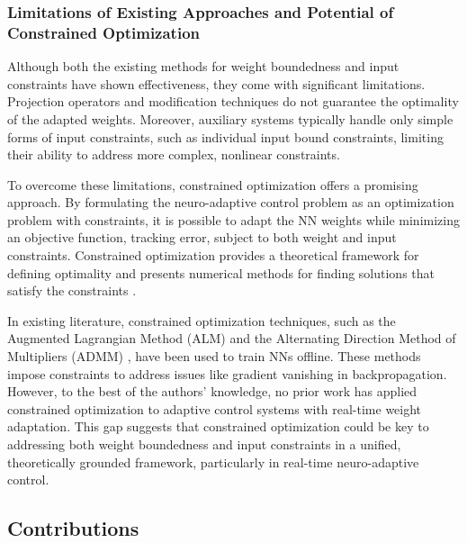 \documentclass[journal]{IEEEtran}
\begin{document}
\hfill

\subsubsection{Limitations of Existing Approaches and Potential of Constrained Optimization}

Although both the existing methods for weight boundedness and input constraints have shown effectiveness, they come with significant limitations. 
Projection operators and modification techniques do not guarantee the optimality of the adapted weights. 
Moreover, auxiliary systems typically handle only simple forms of input constraints, such as individual input bound constraints, limiting their ability to address more complex, nonlinear constraints.

To overcome these limitations, constrained optimization offers a promising approach. 
By formulating the neuro-adaptive control problem as an optimization problem with constraints, it is possible to adapt the NN weights while minimizing an objective function, \eg tracking error, subject to both weight and input constraints. 
Constrained optimization provides a theoretical framework for defining optimality and presents numerical methods for finding solutions that satisfy the constraints \cite{Nocedal:2006aa}.

In existing literature, constrained optimization techniques, such as the Augmented Lagrangian Method (ALM) \cite{Evens:2021aa} and the Alternating Direction Method of Multipliers (ADMM) \cite{Wang:2019aa,Taylor:2016aa}, have been used to train NNs offline. 
These methods impose constraints to address issues like gradient vanishing in backpropagation. 
However, to the best of the authors' knowledge, no prior work has applied constrained optimization to adaptive control systems with real-time weight adaptation. 
This gap suggests that constrained optimization could be key to addressing both weight boundedness and input constraints in a unified, theoretically grounded framework, particularly in real-time neuro-adaptive control.

\subsection{Contributions}
\end{document}
